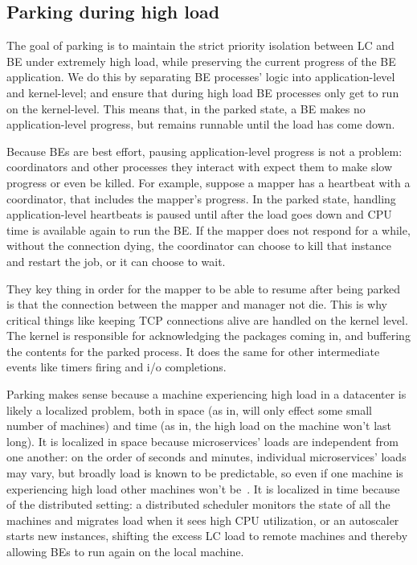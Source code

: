 \subsection{Parking during high load}\label{ss:approach:parking}

The goal of parking is to maintain the strict priority isolation between LC and
BE under extremely high load, while preserving the current progress of the BE
application. We do this by separating BE processes' logic into application-level
and kernel-level; and ensure that during high load BE processes only get to run
on the kernel-level. This means that, in the parked state, a BE makes no
application-level progress, but remains runnable until the load has come down.

Because BEs are best effort, pausing application-level progress is not a
problem: coordinators and other processes they interact with expect them to make
slow progress or even be killed. For example, suppose a mapper has a heartbeat
with a coordinator, that includes the mapper's progress. In the parked state,
handling application-level heartbeats is paused until after the load goes down
and CPU time is available again to run the BE. If the mapper does not respond
for a while, without the connection dying, the coordinator can choose to kill
that instance and restart the job, or it can choose to wait.

They key thing in order for the mapper to be able to resume after being parked
is that the connection between the mapper and manager not die. This is why
critical things like keeping TCP connections alive are handled on the kernel
level. The kernel is responsible for acknowledging the packages coming in, and
buffering the contents for the parked process. It does the same for other
intermediate events like timers firing and i/o completions.

Parking makes sense because a machine experiencing high load in a datacenter is
likely a localized problem, both in space (as in, will only effect some small
number of machines) and time (as in, the high load on the machine won't last
long). It is localized in space because microservices' loads are independent
from one another: on the order of seconds and minutes, individual microservices'
loads may vary, but broadly load is known to be predictable, so even if one
machine is experiencing high load other machines won't be~\cite{TODO}. It is
localized in time because of the distributed setting: a distributed scheduler
monitors the state of all the machines and migrates load when it sees high CPU
utilization, or an autoscaler starts new instances, shifting the excess LC load
to remote machines and thereby allowing BEs to run again on the local machine.